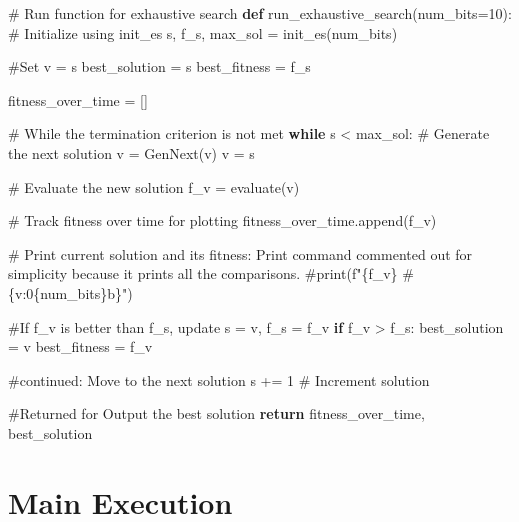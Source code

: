 \documentclass[
  letterpaper,
  DIV=11,
  numbers=noendperiod]{scrreprt}
\newenvironment{Shaded}{\begin{snugshade}}{\end{snugshade}}
\newcommand{\CommentTok}[1]{\textcolor[rgb]{0.37,0.37,0.37}{#1}}
\newcommand{\ControlFlowTok}[1]{\textcolor[rgb]{0.00,0.23,0.31}{\textbf{#1}}}
\newcommand{\DecValTok}[1]{\textcolor[rgb]{0.68,0.00,0.00}{#1}}
\newcommand{\KeywordTok}[1]{\textcolor[rgb]{0.00,0.23,0.31}{\textbf{#1}}}
\newcommand{\NormalTok}[1]{\textcolor[rgb]{0.00,0.23,0.31}{#1}}
\newcommand{\OperatorTok}[1]{\textcolor[rgb]{0.37,0.37,0.37}{#1}}
\begin{document}
\begin{Shaded}
\begin{Highlighting}[]
\CommentTok{\# Run function for exhaustive search}
\KeywordTok{def}\NormalTok{ run\_exhaustive\_search(num\_bits}\OperatorTok{=}\DecValTok{10}\NormalTok{):}
    \CommentTok{\# Initialize using init\_es}
\NormalTok{    s, f\_s, max\_sol }\OperatorTok{=}\NormalTok{ init\_es(num\_bits)}
    
    \CommentTok{\#Set v = s}
\NormalTok{    best\_solution }\OperatorTok{=}\NormalTok{ s}
\NormalTok{    best\_fitness }\OperatorTok{=}\NormalTok{ f\_s}
    
\NormalTok{    fitness\_over\_time }\OperatorTok{=}\NormalTok{ []}
    
    \CommentTok{\# While the termination criterion is not met}
    \ControlFlowTok{while}\NormalTok{ s }\OperatorTok{\textless{}}\NormalTok{ max\_sol:}
        \CommentTok{\# Generate the next solution v = GenNext(v)}
\NormalTok{        v }\OperatorTok{=}\NormalTok{ s}
        
        \CommentTok{\# Evaluate the new solution}
\NormalTok{        f\_v }\OperatorTok{=}\NormalTok{ evaluate(v)}
        
        \CommentTok{\# Track fitness over time for plotting}
\NormalTok{        fitness\_over\_time.append(f\_v)}
        
        \CommentTok{\# Print current solution and its fitness: Print command commented out for simplicity because it prints all the comparisons. }
        \CommentTok{\#print(f"\{f\_v\} \# \{v:0\{num\_bits\}b\}")}
        
        \CommentTok{\#If f\_v is better than f\_s, update s = v, f\_s = f\_v}
        \ControlFlowTok{if}\NormalTok{ f\_v }\OperatorTok{\textgreater{}}\NormalTok{ f\_s:}
\NormalTok{            best\_solution }\OperatorTok{=}\NormalTok{ v}
\NormalTok{            best\_fitness }\OperatorTok{=}\NormalTok{ f\_v}
        
        \CommentTok{\#continued: Move to the next solution}
\NormalTok{        s }\OperatorTok{+=} \DecValTok{1}  \CommentTok{\# Increment solution}
    
    \CommentTok{\#Returned for Output the best solution}
    \ControlFlowTok{return}\NormalTok{ fitness\_over\_time, best\_solution}
\end{Highlighting}
\end{Shaded}

\section{Main Execution}\label{main-execution}
\end{document}
